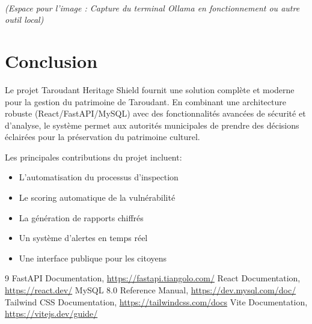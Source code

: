 \documentclass[12pt,a4paper]{article}
\begin{document}
\vspace{0.5cm}
\begin{center}
    \fbox{\rule{0pt}{3cm} \rule{0.6\linewidth}{0pt}} \\
    \textit{\small (Espace pour l'image : Capture du terminal Ollama en fonctionnement ou autre outil local)}
\end{center}

\clearpage
\section{Conclusion}

Le projet Taroudant Heritage Shield fournit une solution complète et moderne pour la gestion du patrimoine de Taroudant. En combinant une architecture robuste (React/FastAPI/MySQL) avec des fonctionnalités avancées de sécurité et d'analyse, le système permet aux autorités municipales de prendre des décisions éclairées pour la préservation du patrimoine culturel.

Les principales contributions du projet incluent:
\begin{itemize}
    \item L'automatisation du processus d'inspection
    \item Le scoring automatique de la vulnérabilité
    \item La génération de rapports chiffrés
    \item Un système d'alertes en temps réel
    \item Une interface publique pour les citoyens
\end{itemize}

\begin{thebibliography}{9}
     FastAPI Documentation, \url{https://fastapi.tiangolo.com/}
     React Documentation, \url{https://react.dev/}
     MySQL 8.0 Reference Manual, \url{https://dev.mysql.com/doc/}
     Tailwind CSS Documentation, \url{https://tailwindcss.com/docs}
     Vite Documentation, \url{https://vitejs.dev/guide/}
\end{thebibliography}
\end{document}
